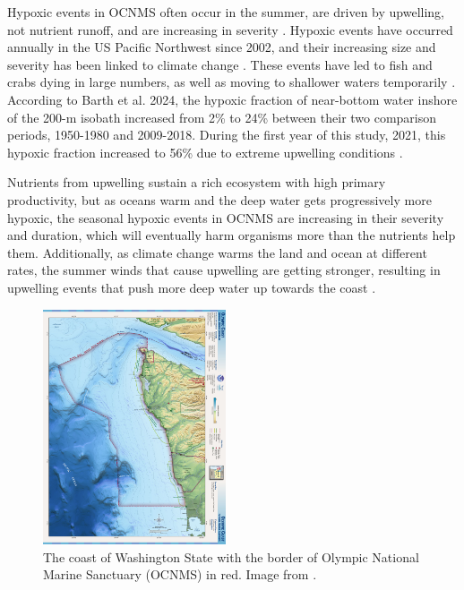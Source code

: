 \documentclass[12pt,twoside]{reedthesis}
\begin{document}
Hypoxic events in OCNMS often occur in the summer, are driven by upwelling, not nutrient runoff, and are increasing in severity \autocite{Barth2024}. Hypoxic events have occurred annually in the US Pacific Northwest since 2002, and their increasing size and severity has been linked to climate change \autocite{Bograd2023, Parks2009}. These events have led to fish and crabs dying in large numbers, as well as moving to shallower waters temporarily \autocite{Grantham2004}. According to Barth et al. 2024, the hypoxic fraction of near-bottom water inshore of the 200-m isobath increased from 2\% to 24\% between their two comparison periods, 1950-1980 and 2009-2018. During the first year of this study, 2021, this hypoxic fraction increased to 56\% due to extreme upwelling conditions \autocite{Barth2024}. 

Nutrients from upwelling sustain a rich ecosystem with high primary productivity, but as oceans warm and the deep water gets progressively more hypoxic, the seasonal hypoxic events in OCNMS are increasing in their severity and duration, which will eventually harm organisms more than the nutrients help them. Additionally, as climate change warms the land and ocean at different rates, the summer winds that cause upwelling are getting stronger, resulting in upwelling events that push more deep water up towards the coast \autocite{Barth2024}. 

\begin{figure}
	\begin{center}
		\includegraphics[width=0.48\textwidth]{Fig_OCNMS_Map}
		\caption[Map of OCNMS]{\footnotesize{The coast of Washington State with the border of Olympic National Marine Sanctuary (OCNMS) in red. Image from .}} %
		\label{OCNMSMap}
	\end{center}
\end{figure} 
\end{document}

